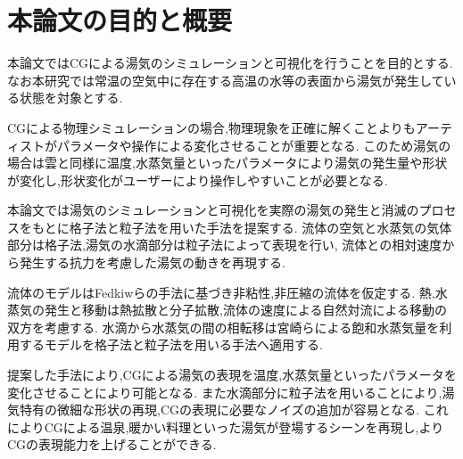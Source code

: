 \section{本論文の目的と概要}

本論文ではCGによる湯気のシミュレーションと可視化を行うことを目的とする.
なお本研究では常温の空気中に存在する高温の水等の表面から湯気が発生している状態を対象とする.

CGによる物理シミュレーションの場合,物理現象を正確に解くことよりもアーティストがパラメータや操作による変化させることが重要となる.
このため湯気の場合は雲と同様に温度,水蒸気量といったパラメータにより湯気の発生量や形状が変化し,形状変化がユーザーにより操作しやすいことが必要となる.

本論文では湯気のシミュレーションと可視化を実際の湯気の発生と消滅のプロセスをもとに格子法と粒子法を用いた手法を提案する.
流体の空気と水蒸気の気体部分は格子法,湯気の水滴部分は粒子法によって表現を行い,
流体との相対速度から発生する抗力を考慮した湯気の動きを再現する.

流体のモデルはFedkiwら\cite{Fedkiw2001}の手法に基づき非粘性,非圧縮の流体を仮定する.
熱,水蒸気の発生と移動は熱拡散と分子拡散,流体の速度による自然対流による移動の双方を考慮する.
水滴から水蒸気の間の相転移は宮崎ら\cite{Miyazaki2001}\cite{Miyazaki2002}による飽和水蒸気量を利用するモデルを格子法と粒子法を用いる手法へ適用する.

提案した手法により,CGによる湯気の表現を温度,水蒸気量といったパラメータを変化させることにより可能となる.
また水滴部分に粒子法を用いることにより,湯気特有の微細な形状の再現,CGの表現に必要なノイズの追加が容易となる.
これによりCGによる温泉,暖かい料理といった湯気が登場するシーンを再現し,よりCGの表現能力を上げることができる.